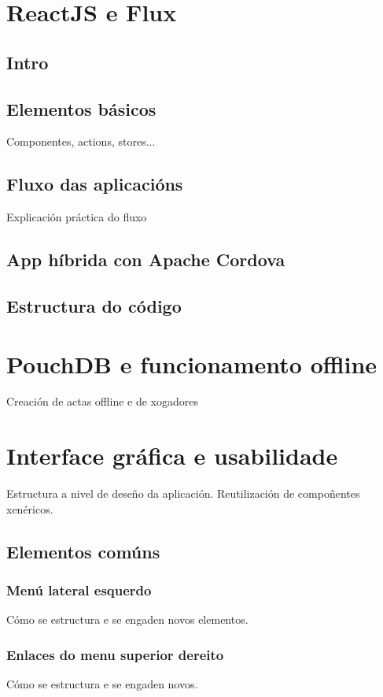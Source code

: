   \section{ReactJS e Flux}
    \subsection{Intro}
    \subsection{Elementos básicos}
    Componentes, actions, stores...
    \subsection{Fluxo das aplicacións}
    Explicación práctica do fluxo
    \subsection{App híbrida con Apache Cordova}

    \subsection{Estructura do código}

  \section{PouchDB e funcionamento offline}
  Creación de actas offline e de xogadores

  \section{Interface gráfica e usabilidade}
  Estructura a nivel de deseño da aplicación. Reutilización de compoñentes xenéricos.

    \subsection{Elementos comúns}

      \subsubsection{Menú lateral esquerdo}
      Cómo se estructura e se engaden novos elementos.

      \subsubsection{Enlaces do menu superior dereito}
      Cómo se estructura e se engaden novos.

